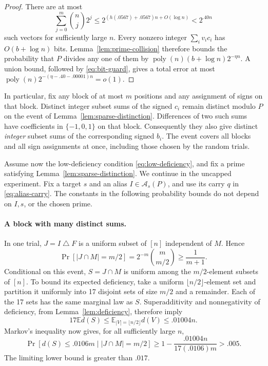 \begin{proof}
There are at most
\[
 \sum_{j=0}^m\binom nj2^j
 \le 2^{(h(.0567)+.0567)n+O(\log n)}
 <2^{.40n}
\]
such vectors for sufficiently large $n$.  Every nonzero integer
$\sum_i v_ic_i$ has $O(b+\log n)$ bits.  Lemma~\ref{lem:prime-collision}
therefore bounds the probability that $P$ divides any one of them by
$\operatorname{poly}(n)(b+\log n)2^{-\eta n}$.
A union bound, followed by \eqref{eq:bit-guard}, gives a total error at most
$\operatorname{poly}(n)2^{-(\eta-.40-.00001)n}=o(1)$.
\end{proof}

In particular, fix any block of at most $m$ positions and any assignment
of signs on that block.  Distinct integer subset sums of the signed $c_i$
remain distinct modulo $P$ on the event of
Lemma~\ref{lem:sparse-distinction}.  Differences of two such sums have
coefficients in $\{-1,0,1\}$ on that block.  Consequently they also give
distinct \emph{integer} subset sums of the corresponding signed $b_i$.
The event covers all blocks and all sign assignments at once, including
those chosen by the random trials.

Assume now the low-deficiency condition \eqref{eq:low-deficiency}, and fix
a prime satisfying Lemma~\ref{lem:sparse-distinction}.  We continue in
the uncapped experiment.  Fix a target $s$ and an alias
$I\in\mathcal A_s(P)$, and use its carry $q$ in
\eqref{eq:alias-carry}.  The constants in the following probability bounds
do not depend on $I,s$, or the chosen prime.

\paragraph{A block with many distinct sums.}
In one trial, $J=I\mathbin\triangle F$ is a uniform subset of $[n]$
independent of $M$.  Hence
\begin{equation}
 \Pr[|J\cap M|=m/2]
   =2^{-m}\binom m{m/2}\ge\frac1{m+1}.
 \label{eq:alias-half-block}
\end{equation}
Conditional on this event, $S=J\cap M$ is uniform among the $m/2$-element
subsets of $[n]$.  To bound its expected deficiency, take a uniform
$\lfloor n/2\rfloor$-element set and partition it uniformly into
17 disjoint sets of size $m/2$ and a remainder.  Each of the 17 sets
has the same marginal law as $S$.  Superadditivity and nonnegativity of
deficiency, from Lemma~\ref{lem:deficiency}, therefore imply
\[
 17\mathbb E d(S)
 \le\mathbb E_{|V|=\lfloor n/2\rfloor}d(V)
 \le .01004n.
\]
Markov's inequality now gives, for all sufficiently large $n$,
\begin{equation}
 \Pr[d(S)\le .0106m\mid |J\cap M|=m/2]
 \ge 1-\frac{.01004n}{17(.0106)m}>.005.
 \label{eq:alias-useful-block}
\end{equation}
The limiting lower bound is greater than $.017$.

